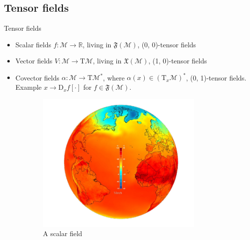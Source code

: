 \documentclass{beamer}
\begin{document}
\subsection{Tensor fields}
\begin{frame}{Tensor fields}
    \begin{itemize}
        \item Scalar fields $f : \mathcal{M} \to \mathbb{R}$, living in $\mathfrak{F}(\mathcal{M})$, (0, 0)-tensor fields
        \item Vector fields $V : \mathcal{M} \to \text{T}\mathcal{M}$, living in $\mathfrak{X}(\mathcal{M})$, (1, 0)-tensor fields
        \item Covector fields $\alpha : \mathcal{M} \to \text{T}\mathcal{M}^*$, where $\alpha(x) \in (\text{T}_x\mathcal{M})^*$, (0, 1)-tensor fields. Example $x \to \text{D}_{x}f[\cdot]$ for $f \in \mathfrak{F}(\mathcal{M})$.
    \end{itemize}
    \begin{figure}[h!]
        \begin{subfigure}{.3333\textwidth}
            \centering  
            \includegraphics[width=0.9\textwidth]{images/temperature.png}
            \caption{A scalar field}
            \label{fig:sub1}
          \end{subfigure}%
          \begin{subfigure}{.3333\textwidth}
            \centering   

\end{subfigure}
\end{figure}
\end{frame}
\end{document}
